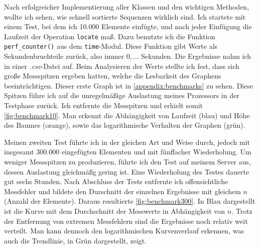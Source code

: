 Nach erfolgreicher Implementierung aller Klassen und den wichtigen Methoden, wollte ich sehen, wie schnell sortierte Sequenzen wirklich sind. Ich startete mit einem Test, bei dem ich 10.000 Elemente einfügte, und nach jeder Einfügung die Laufzeit der Operation \texttt{locate} maß. Dazu benutzte ich die Funktion \texttt{perf\_counter()} aus dem \texttt{time}-Modul. Diese Funktion gibt Werte als Sekundenbruchteile zurück, also immer $0,\dots$ Sekunden. Die Ergebnisse nahm ich in einer \textit{.csv}-Datei auf. Beim Analysieren der Werte stellte ich fest, dass sich große Messspitzen ergeben hatten, welche die Lesbarkeit des Graphens beeinträchtigen. Dieser erste Graph ist in \autoref{appendix:benchmarks} zu sehen. Diese Spitzen führe ich auf die unregelmäßige Auslastung meines Prozessors in der Testphase zurück. Ich entfernte die Messpitzen und erhielt somit \autoref{fig:benchmark10}. Man erkennt die Abhängigkeit von Laufzeit (blau) und Höhe des Baumes (orange), sowie das logarithmische Verhalten der Graphen (grün).
\par
Meinen zweiten Test führte ich in der gleichen Art und Weise durch, jedoch mit insgesamt 300.000 eingefügten Elementen und mit fünffacher Wiederholung. Um weniger Messspitzen zu produzieren, führte ich den Test auf meinem Server aus, dessen Auslastung gleichmäßg gering ist. Eine Wiederholung des Testes dauerte gut sechs Stunden. Nach Abschluss der Tests entfernte ich offensichtliche Messfehler und bildete den Durschnitt der einzelnen Ergebnisse mit gleichem $n$ (Anzahl der Elemente). Daraus resultierte \autoref{fig:benchmark300}. In Blau dargestellt ist die Kurve mit dem Durchschnitt der Messwerte in Abhängigkeit von $n$. Trotz der Entfernung von extremen Messfehlern sind die Ergebnisse noch relativ weit verteilt. Man kann dennoch den logarithmischen Kurvenverlauf erkennen, was auch die Trendlinie, in Grün dargestellt, zeigt.

\begin{figure}
\end{figure}

